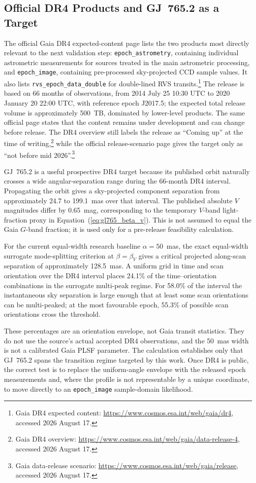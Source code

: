 \subsection{Official DR4 Products and GJ~765.2 as a Target}

The official Gaia DR4 expected-content page lists the two products most directly relevant to the next validation step: \texttt{epoch\_astrometry}, containing individual astrometric measurements for sources treated in the main astrometric processing, and \texttt{epoch\_image}, containing pre-processed sky-projected CCD sample values. It also lists \texttt{rvs\_epoch\_data\_double} for double-lined RVS transits.\footnote{Gaia DR4 expected content: \url{https://www.cosmos.esa.int/web/gaia/dr4}, accessed 2026 August 17.} The release is based on 66 months of observations, from 2014 July 25 10:30 UTC to 2020 January 20 22:00 UTC, with reference epoch J2017.5; the expected total release volume is approximately 500~TB, dominated by lower-level products. The same official page states that the content remains under development and can change before release. The DR4 overview still labels the release as ``Coming up'' at the time of writing,\footnote{Gaia DR4 overview: \url{https://www.cosmos.esa.int/web/gaia/data-release-4}, accessed 2026 August 17.} while the official release-scenario page gives the target only as ``not before mid 2026''.\footnote{Gaia data-release scenario: \url{https://www.cosmos.esa.int/web/gaia/release}, accessed 2026 August 17.}

GJ~765.2 is a useful prospective DR4 target because its published orbit naturally crosses a wide angular-separation range during the 66-month DR4 interval. Propagating the \citet{Balega2007} orbit gives a sky-projected component separation from approximately 24.7 to 199.1~mas over that interval. The published absolute $V$ magnitudes differ by 0.65~mag, corresponding to the temporary $V$-band light-fraction proxy in Equation~(\ref{eq:gl765_beta_v}). This is not assumed to equal the Gaia $G$-band fraction; it is used only for a pre-release feasibility calculation.

For the current equal-width research baseline $\alpha=50$~mas, the exact equal-width surrogate mode-splitting criterion at $\beta=\beta_V$ gives a critical projected along-scan separation of approximately 128.5~mas. A uniform grid in time and scan orientation over the DR4 interval places 24.1\% of the time--orientation combinations in the surrogate multi-peak regime. For 58.0\% of the interval the instantaneous sky separation is large enough that at least some scan orientations can be multi-peaked; at the most favourable epoch, 55.3\% of possible scan orientations cross the threshold.

These percentages are an orientation envelope, not Gaia transit statistics. They do not use the source's actual accepted DR4 observations, and the 50~mas width is not a calibrated Gaia PLSF parameter. The calculation establishes only that GJ~765.2 spans the transition regime targeted by this work. Once DR4 is public, the correct test is to replace the uniform-angle envelope with the released epoch measurements and, where the profile is not representable by a unique coordinate, to move directly to an \texttt{epoch\_image} sample-domain likelihood.
